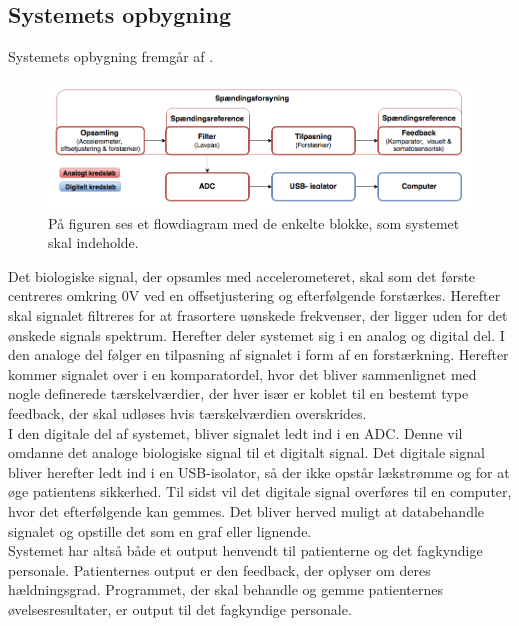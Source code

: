 \subsection{Systemets opbygning}\label{ref:blokdiagram}
Systemets opbygning fremgår af .

\begin{figure}[H]
	\centering
	\includegraphics[scale=0.7]{figures/cProblemloesning/blokdiagram.PNG}
	\caption{På figuren ses et flowdiagram med de enkelte blokke, som systemet skal indeholde.}
	\label{kravblok}
\end{figure}
Det biologiske signal, der opsamles med accelerometeret, skal som det første centreres omkring $0$V ved en offsetjustering og efterfølgende forstærkes. Herefter skal signalet filtreres for at frasortere uønskede frekvenser, der ligger uden for det ønskede signals spektrum. Herefter deler systemet sig i en analog og digital del. I den analoge del følger en tilpasning af signalet i form af en forstærkning. Herefter kommer signalet over i en komparatordel, hvor det bliver sammenlignet med nogle definerede tærskelværdier, der hver især er koblet til en bestemt type feedback, der skal udløses hvis tærskelværdien overskrides. \\
I den digitale del af systemet, bliver signalet ledt ind i en ADC. Denne vil omdanne det analoge biologiske signal til et digitalt signal. Det digitale signal bliver herefter ledt ind i en USB-isolator, så der ikke opstår lækstrømme og for at øge patientens sikkerhed. Til sidst vil det digitale signal overføres til en computer, hvor det efterfølgende kan gemmes. Det bliver herved muligt at databehandle signalet og opstille det som en graf eller lignende. \\
Systemet har altså både et output henvendt til patienterne og det fagkyndige personale. Patienternes output er den feedback, der oplyser om deres hældningsgrad. Programmet, der skal behandle og gemme patienternes øvelsesresultater, er output til det fagkyndige personale.

